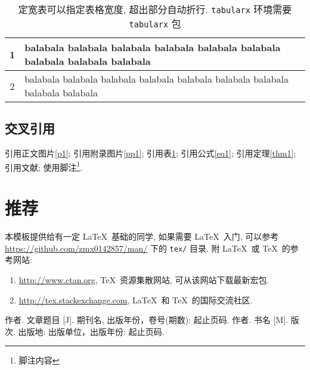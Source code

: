 \documentclass{lzuthesis}
\begin{document}
\begin{table}[!h]
	\caption{定宽表可以指定表格宽度, 超出部分自动折行. \texttt{tabularx} 环境需要 \texttt{tabularx} 包}
	\label{定宽表}
	\centering
	\begin{tabularx}{0.6\linewidth}{c|X}
		\hline
		1 & balabala  balabala  balabala  balabala  balabala  balabala  balabala  balabala  balabala \\
		\hline
		2 & balabala  balabala  balabala  balabala  balabala  balabala  balabala  balabala  balabala \\
		\hline
	\end{tabularx}
\end{table}

\subsection{交叉引用}

引用正文图片\ref{p1}; 引用附录图片\ref{pp1};
引用表\ref{定宽表};
引用公式\ref{eq1};
引用定理\ref{thm1};
引用文献;
使用脚注\footnote{脚注内容}.

\section{推荐}

本模板提供给有一定 \LaTeX\ 基础的同学, 如果需要 \LaTeX\ 入门, 可以参考
\url{https://github.com/zmx0142857/man/} 下的 \verb|tex/| 目录.
附 \LaTeX\ 或 \TeX\ 的参考网站:
\begin{enumerate}
	\item \url{http://www.ctan.org}, \TeX\ 资源集散网站, 可从该网站下载最新宏包.
	\item \url{http://tex.stackexchange.com}, \LaTeX\ 和 \TeX\ 的国际交流社区.
\end{enumerate}


\begin{bibliography}
	 作者. 文章题目 [J].  期刊名, 出版年份，卷号(期数):
		起止页码.
	 作者. 书名 [M]. 版次.
		出版地: 出版单位，出版年份: 起止页码.
\end{bibliography}
\end{document}
